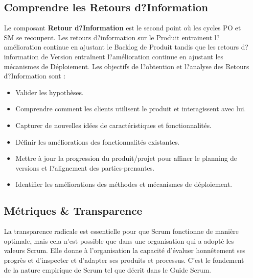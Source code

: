 \documentclass[12pt,a4paper,parskip=full]{scrartcl}
\begin{document}
\subsection{Comprendre les Retours d?Information}
Le composant \textbf{Retour d?Information} est le second point où les cycles PO et SM se
recoupent. Les retours d?information sur le Produit entrainent l?amélioration continue en ajustant le
Backlog de Produit tandis que les retours d?information de Version entraînent
l?amélioration continue en ajustant les mécanismes de Déploiement. Les objectifs de
l?obtention et l?analyse des Retours d?Information sont :
\begin{itemize}
\item Valider les hypothèses.
\item Comprendre comment les clients utilisent le produit et interagissent avec lui.
\item Capturer de nouvelles idées de caractéristiques et fonctionnalités.
\item Définir les améliorations des fonctionnalités existantes.
\item Mettre à jour la progression du produit/projet pour affiner le planning de versions et
l?alignement des parties-prenantes.
\item Identifier les améliorations des méthodes et mécanismes de déploiement.
\end{itemize}

\subsection{Métriques \& Transparence}
La transparence radicale est essentielle pour que Scrum fonctionne de manière
optimale, mais cela n'est possible que dans une organisation qui a adopté les valeurs
Scrum. Elle donne à l'organisation la capacité d'évaluer honnêtement ses progrès et
d'inspecter et d'adapter ses produits et processus. C'est le fondement de la nature
empirique de Scrum tel que décrit dans le Guide Scrum.
\end{document}

